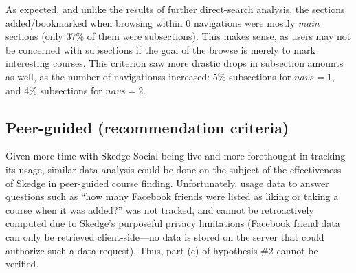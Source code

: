   As expected, and unlike the results of further direct-search analysis, the sections added/bookmarked when browsing within 0 navigations were mostly \emph{main} sections (only 37\% of them were subsections). This makes sense, as users may not be concerned with subsections if the goal of the browse is merely to mark interesting courses. This criterion saw more drastic drops in subsection amounts as well, as the number of navigationss increased: 5\% subsections for ${navs}=1$, and 4\% subsections for ${navs}=2$.

\subsection{Peer-guided (recommendation criteria)}

  Given more time with Skedge Social being live and more forethought in tracking its usage, similar data analysis could be done on the subject of the effectiveness of Skedge in peer-guided course finding. Unfortunately, usage data to answer questions such as ``how many Facebook friends were listed as liking or taking a course when it was added?'' was not tracked, and cannot be retroactively computed due to Skedge's purposeful privacy limitations (Facebook friend data can only be retrieved client-side---no data is stored on the server that could authorize such a data request). Thus, part (c) of hypothesis \#2 cannot be verified.
